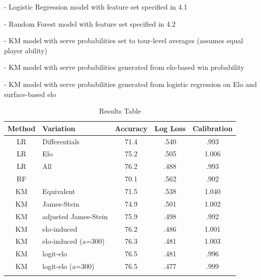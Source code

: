 \documentclass[chapterprefix=false]{report}
\begin{document}
\begin{description}[leftmargin=1.7cm, labelindent=1.7cm]
\item[LR] - Logistic Regression model with feature set specified in 4.1

\item[RF] - Random Forest model with feature set specified in 4.2

\item[Equivalent] - KM model with serve probabilities set to tour-level averages (assumes equal player ability)

\item[elo-induced] - KM model with serve probabilities generated from elo-based win probability

\item[logit-elo] - KM model with serve probabilities generated from logistic regression on Elo and surface-based elo
\end{description}





\begin{center}
\begin{table}[H]
        \caption{Results Table}
        \centering
        \begin{tabular}{@{}clccc@{}}
            \toprule
            Method & Variation & Accuracy & Log Loss & Calibration \\\midrule

            LR & Differentials & 71.4 & .540 & .993  \\\addlinespace
            
            LR & Elo & 75.2 & .505 & 1.006
  \\\addlinespace
 LR & All & 76.2 & .488 & .993
  \\\addlinespace
 RF &  & 70.1 & .562 & .902\\\addlinespace
 KM & Equivalent & 71.5 & .538 & 1.040\\\addlinespace
 KM & James-Stein & 74.9 & .501 & 1.002\\\addlinespace
 KM & adjusted James-Stein & 75.9 & .498 & .992\\\addlinespace
 KM & elo-induced & 76.2 & .486 & 1.001\\\addlinespace
 KM & elo-induced (a=300) & 76.3 & .481 & 1.003\\\addlinespace
 KM & logit-elo & 76.5 & .481 & .996\\\addlinespace
 KM & logit-elo (a=300) & 76.5 & .477 & .999\\\addlinespace
            \bottomrule
        \end{tabular}
    \end{table}
    \end{center}
\end{document}
